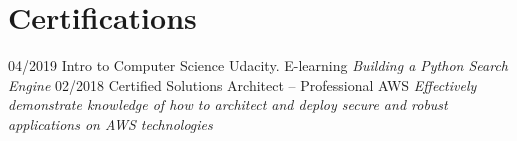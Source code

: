 \documentclass[]{friggeri-cv}
\begin{document}
\section{Certifications}
\begin{entrylist}
  \entry
    {04/2019}
    {Intro to Computer Science}
    {Udacity. E-learning}
    {\emph{Building a Python Search Engine}}
     \entry
    {02/2018}
    {Certified Solutions Architect – Professional }
    {AWS}
    {\emph{Effectively demonstrate knowledge of how to architect and deploy secure and robust applications on AWS technologies}}
\end{entrylist}
\end{document}
